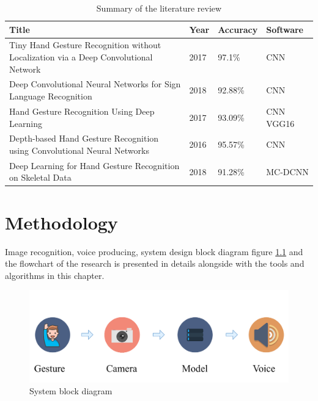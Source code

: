 \documentclass[12pt]{report}
\begin{document}
\begin{center}
    \begin{table}[h]
        \caption{Summary of the literature review}
        \begin{tabular}{ |p{7cm}|p{2cm}|p{2cm}|p{3cm}| }
            \hline
            Title & Year & Accuracy & Software\\
            \hline
            Tiny Hand Gesture Recognition without Localization via a Deep Convolutional Network & 2017 & 97.1\%& CNN \\
            \hline
            Deep Convolutional Neural Networks for Sign Language Recognition & 2018 & 92.88\% & CNN \\
            \hline
            Hand Gesture Recognition Using Deep Learning & 2017 & 93.09\% & CNN VGG16 \\
            \hline
            Depth-based Hand Gesture Recognition using Convolutional Neural Networks & 2016 & 95.57\% & CNN \\
            \hline
            Deep Learning for Hand Gesture Recognition on Skeletal Data & 2018 & 91.28\% & MC-DCNN \\
            \hline
        \end{tabular}
        \label{table:summary}
    \end{table}
\end{center}
\newpage

\chapter{Methodology}

Image recognition, voice producing, system design block diagram figure \ref{fig:system_diagram} 
and the flowchart of the research is presented in details alongside with the tools
and algorithms in this chapter.


\begin{figure}[h]
    \centering
    \includegraphics[width=\textwidth]{./images/system_diagram.png}
    \caption{System block diagram}
    \label{fig:system_diagram}
\end{figure}
\end{document}
